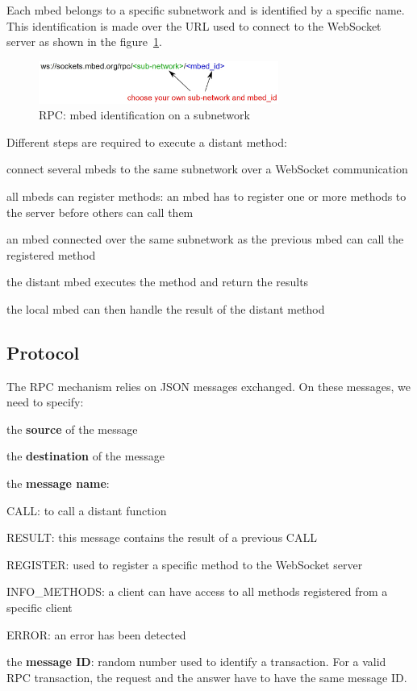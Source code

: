 \documentclass[pdftex,10pt,a4paper]{report}
\newenvironment{packed_item}{
\begin{itemize}
  \setlength{\itemsep}{1pt}
  \setlength{\parskip}{0pt}
  \setlength{\parsep}{0pt}
}{\end{itemize}}
\begin{document}
Each mbed belongs to a specific subnetwork and is identified by a specific name. This identification is made over the URL used to connect to the WebSocket server as shown in the figure~\ref{RPC: mbed identification on a subnetwork}. \\

\begin{figure}[h!]
		\centering
		\includegraphics[width=0.7\textwidth]{./rpc_ws.jpg}
		\caption{RPC: mbed identification on a subnetwork}
		\label{RPC: mbed identification on a subnetwork}
\end{figure}

Different steps are required to execute a distant method:
\begin{packed_item}
	\item connect several mbeds to the same subnetwork over a WebSocket communication
	\item all mbeds can register methods: an mbed has to register one or more methods to the server before others can call them
	\item an mbed connected over the same subnetwork as the previous mbed can call the registered method
	\item the distant mbed executes the method and return the results
	\item the local mbed can then handle the result of the distant method
\end{packed_item}

\subsection{Protocol}
The RPC mechanism relies on JSON messages exchanged. On these messages, we need to specify:
\begin{packed_item}
	\item the \textbf{source} of the message
	\item the \textbf{destination} of the message
	\item the \textbf{message name}:
		\begin{packed_item}
			\item CALL: to call a distant function
			\item RESULT: this message contains the result of a previous CALL
			\item REGISTER: used to register a specific method to the WebSocket server
			\item INFO\_METHODS: a client can have access to all methods registered from a specific client
			\item ERROR: an error has been detected
		\end{packed_item}
	\item the \textbf{message ID}: random number used to identify a transaction. For a valid RPC transaction, the request and the answer have to have the same message ID.
\end{packed_item}
\end{document}
